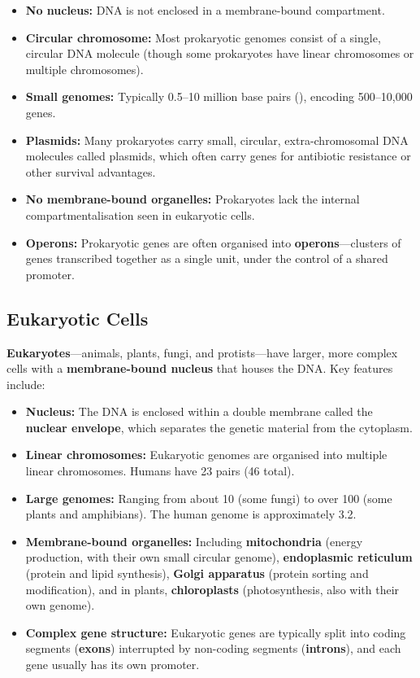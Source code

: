 \begin{itemize}[itemsep=2pt]
  \item \textbf{No nucleus:} DNA is not enclosed in a membrane-bound compartment.
  \item \textbf{Circular chromosome:} Most prokaryotic genomes consist of a single, circular DNA molecule (though some prokaryotes have linear chromosomes or multiple chromosomes).
  \item \textbf{Small genomes:} Typically 0.5--10 million base pairs (\megabase{}), encoding 500--10,000 genes.
  \item \textbf{Plasmids:} Many prokaryotes carry small, circular, extra-chromosomal DNA molecules called plasmids, which often carry genes for antibiotic resistance or other survival advantages.
  \item \textbf{No membrane-bound organelles:} Prokaryotes lack the internal compartmentalisation seen in eukaryotic cells.
  \item \textbf{Operons:} Prokaryotic genes are often organised into \textbf{operons}---clusters of genes transcribed together as a single unit, under the control of a shared promoter.
\end{itemize}

\subsection{Eukaryotic Cells}
\label{subsec:molbio:eukaryotes}

\textbf{Eukaryotes}---animals, plants, fungi, and protists---have larger, more complex cells with a \textbf{membrane-bound nucleus} that houses the DNA. Key features include:

\begin{itemize}[itemsep=2pt]
  \item \textbf{Nucleus:} The DNA is enclosed within a double membrane called the \textbf{nuclear envelope}, which separates the genetic material from the cytoplasm.
  \item \textbf{Linear chromosomes:} Eukaryotic genomes are organised into multiple linear chromosomes. Humans have 23 pairs (46 total).
  \item \textbf{Large genomes:} Ranging from about 10\megabase{} (some fungi) to over 100\gigabase{} (some plants and amphibians). The human genome is approximately 3.2\gigabase{}.
  \item \textbf{Membrane-bound organelles:} Including \textbf{mitochondria} (energy production, with their own small circular genome), \textbf{endoplasmic reticulum} (protein and lipid synthesis), \textbf{Golgi apparatus} (protein sorting and modification), and in plants, \textbf{chloroplasts} (photosynthesis, also with their own genome).
  \item \textbf{Complex gene structure:} Eukaryotic genes are typically split into coding segments (\textbf{exons}) interrupted by non-coding segments (\textbf{introns}), and each gene usually has its own promoter.
\end{itemize}

